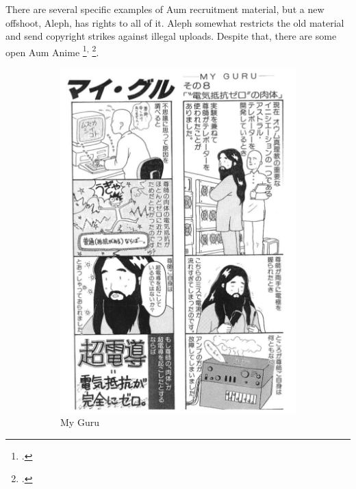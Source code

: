 \documentclass[12pt, letterpaper]{article}
\begin{document}
There are several specific examples of Aum recruitment material, but a new offshoot, Aleph, has rights to all
of it. Aleph somewhat restricts the old material and send copyright strikes against illegal uploads. Despite
that, there are some open Aum Anime \footcite{noauthor_aum_nodate}\textsuperscript{,} \footcite{noauthor_aum_nodate-1}.

\begin{figure}[h]
  \caption{Aum Manga}
  \label{fig:aumManga1}
  \centering
  \begin{subfigure}[b]{.4\linewidth}
    \includegraphics[width=\linewidth]{myGuru.png}
    \caption{My Guru}
  \end{subfigure}
  \begin{subfigure}[b]{.4\linewidth}

\end{subfigure}
\end{figure}
\end{document}
